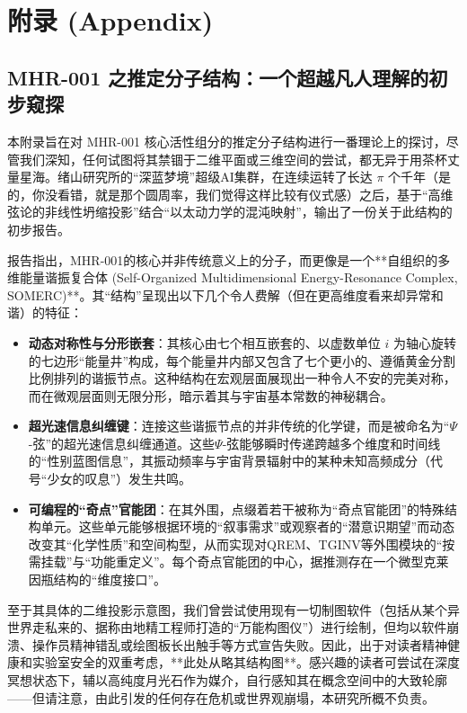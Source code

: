 
\appendix
\section{附录 (Appendix)}

\subsection{MHR-001 之推定分子结构：一个超越凡人理解的初步窥探}
\label{sec:mhr001_structure_theory}

本附录旨在对 MHR-001 核心活性组分的推定分子结构进行一番理论上的探讨，尽管我们深知，任何试图将其禁锢于二维平面或三维空间的尝试，都无异于用茶杯丈量星海。绪山研究所的“深蓝梦境”超级AI集群，在连续运转了长达 $\pi$ 个千年（是的，你没看错，就是那个圆周率，我们觉得这样比较有仪式感）之后，基于“高维弦论的非线性坍缩投影”结合“以太动力学的混沌映射”，输出了一份关于此结构的初步报告。

报告指出，MHR-001的核心并非传统意义上的分子，而更像是一个**自组织的多维能量谐振复合体 (Self-Organized Multidimensional Energy-Resonance Complex, SOMERC)**。其“结构”呈现出以下几个令人费解（但在更高维度看来却异常和谐）的特征：

\begin{itemize}
    \item \textbf{动态对称性与分形嵌套}：其核心由七个相互嵌套的、以虚数单位 $i$ 为轴心旋转的七边形“能量井”构成，每个能量井内部又包含了七个更小的、遵循黄金分割比例排列的谐振节点。这种结构在宏观层面展现出一种令人不安的完美对称，而在微观层面则无限分形，暗示着其与宇宙基本常数的神秘耦合。
    \item \textbf{超光速信息纠缠键}：连接这些谐振节点的并非传统的化学键，而是被命名为“$\Psi$-弦”的超光速信息纠缠通道。这些$\Psi$-弦能够瞬时传递跨越多个维度和时间线的“性别蓝图信息”，其振动频率与宇宙背景辐射中的某种未知高频成分（代号“少女的叹息”）发生共鸣。
    \item \textbf{可编程的“奇点”官能团}：在其外围，点缀着若干被称为“奇点官能团”的特殊结构单元。这些单元能够根据环境的“叙事需求”或观察者的“潜意识期望”而动态改变其“化学性质”和空间构型，从而实现对QREM、TGINV等外围模块的“按需挂载”与“功能重定义”。每个奇点官能团的中心，据推测存在一个微型克莱因瓶结构的“维度接口”。
\end{itemize}

至于其具体的二维投影示意图，我们曾尝试使用现有一切制图软件（包括从某个异世界走私来的、据称由地精工程师打造的“万能构图仪”）进行绘制，但均以软件崩溃、操作员精神错乱或绘图板长出触手等方式宣告失败。因此，出于对读者精神健康和实验室安全的双重考虑，**此处从略其结构图**。感兴趣的读者可尝试在深度冥想状态下，辅以高纯度月光石作为媒介，自行感知其在概念空间中的大致轮廓——但请注意，由此引发的任何存在危机或世界观崩塌，本研究所概不负责。


